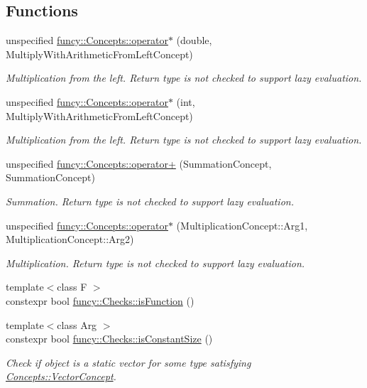 \subsection*{Functions}
\begin{DoxyCompactItemize}
\item 
unspecified \hyperlink{group__ConceptGroup_ga499e3c82ec16cb79ca3ef4e4dfcbbfb5}{funcy\-::\-Concepts\-::operator$\ast$} (double, Multiply\-With\-Arithmetic\-From\-Left\-Concept)
\begin{DoxyCompactList}\small\item\em Multiplication from the left. Return type is not checked to support lazy evaluation. \end{DoxyCompactList}\item 
unspecified \hyperlink{group__ConceptGroup_ga33a9db638e532658e3b0ce78e2b8a8d4}{funcy\-::\-Concepts\-::operator$\ast$} (int, Multiply\-With\-Arithmetic\-From\-Left\-Concept)
\begin{DoxyCompactList}\small\item\em Multiplication from the left. Return type is not checked to support lazy evaluation. \end{DoxyCompactList}\item 
unspecified \hyperlink{group__ConceptGroup_ga13e0cc4a3b1f8a7f286fc017458c4364}{funcy\-::\-Concepts\-::operator+} (Summation\-Concept, Summation\-Concept)
\begin{DoxyCompactList}\small\item\em Summation. Return type is not checked to support lazy evaluation. \end{DoxyCompactList}\item 
unspecified \hyperlink{group__ConceptGroup_ga38d0d06854345ffc7ce9b41a1132e11c}{funcy\-::\-Concepts\-::operator$\ast$} (Multiplication\-Concept\-::\-Arg1, Multiplication\-Concept\-::\-Arg2)
\begin{DoxyCompactList}\small\item\em Multiplication. Return type is not checked to support lazy evaluation. \end{DoxyCompactList}\item 
{\footnotesize template$<$class F $>$ }\\constexpr bool \hyperlink{group__ConceptGroup_ga174e2d9fe934ee3184d9c656b219d754}{funcy\-::\-Checks\-::is\-Function} ()
\item 
{\footnotesize template$<$class Arg $>$ }\\constexpr bool \hyperlink{group__ConceptGroup_ga84efea3afd51e9db8be11ee2a5335c98}{funcy\-::\-Checks\-::is\-Constant\-Size} ()
\begin{DoxyCompactList}\small\item\em Check if object is a static vector for some type satisfying \hyperlink{structfuncy_1_1Concepts_1_1VectorConcept}{Concepts\-::\-Vector\-Concept}. \end{DoxyCompactList}\end{DoxyCompactItemize}


